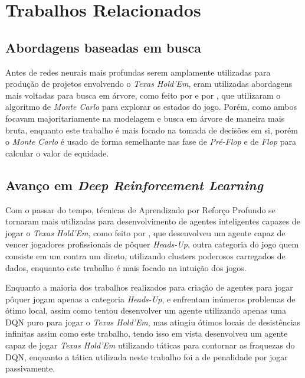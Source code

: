 \chapter{Trabalhos Relacionados}
\label{cap:trabalhos-relacionados}

\section{Abordagens baseadas em busca}

Antes de redes neurais mais profundas serem amplamente utilizadas para produção de projetos envolvendo o \textit{Texas Hold'Em}, eram utilizadas abordagens mais voltadas para busca em árvore, como feito por  e por , que utilizaram o algoritmo de \textit{Monte Carlo} para explorar os estados do jogo. Porém, como ambos focavam majoritariamente na modelagem e busca em árvore de maneira mais bruta, enquanto este trabalho é mais focado na tomada de decisões em si, porém o \textit{Monte Carlo} é usado de forma semelhante nas fase de \textit{Pré-Flop} e de \textit{Flop} para calcular o valor de equidade.

\section{Avanço em \textit{Deep Reinforcement Learning}}

Com o passar do tempo, técnicas de Aprendizado por Reforço Profundo se tornaram mais utilizadas para desenvolvimento de agentes inteligentes capazes de jogar o \textit{Texas Hold'Em}, como feito por , que desenvolveu um agente capaz de vencer jogadores profissionais de pôquer \textit{Heads-Up}, outra categoria do jogo quem consiste em um contra um direto, utilizando clusters poderosos carregados de dados, enquanto este trabalho é mais focado na intuição dos jogos.

Enquanto a maioria dos trabalhos realizados para criação de agentes para jogar pôquer jogam apenas a categoria \textit{Heads-Up}, e enfrentam inúmeros problemas de ótimo local, assim como  tentou desenvolver um agente utilizando apenas uma \gls{DQN} puro para jogar o \textit{Texas Hold'Em}, mas atingiu ótimos locais de desistências infinitas assim como este trabalho, tendo isso em vista  desenvolveu um agente capaz de jogar \textit{Texas Hold'Em} utilizando táticas para contornar as fraquezas do \gls{DQN}, enquanto a tática utilizada neste trabalho foi a de penalidade por jogar passivamente.

